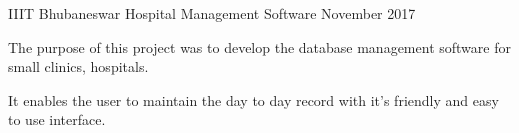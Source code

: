 \begin{cventries}
\cventry
    {IIIT Bhubaneswar}
    {Hospital Management Software}
    {}
    {November 2017}
    {
     \begin{cvitems} %
        \item {The purpose of this project was to develop the database management software for small clinics, hospitals.}
        \item{It enables the user to maintain the day to day record with it’s friendly and easy to use interface.}
      \end{cvitems}
    }

\end{cventries}


